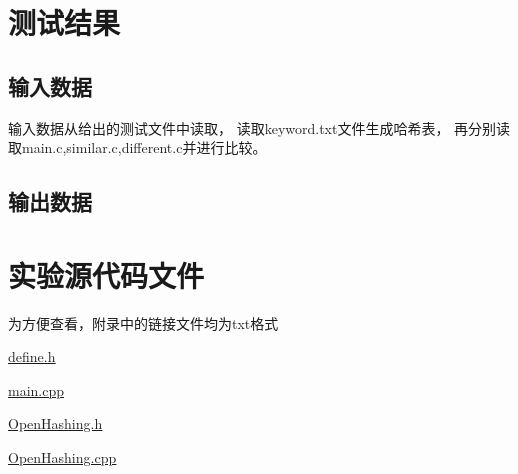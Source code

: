 \documentclass[a4paper]{article}
\begin{document}
    \section{测试结果}\label{sec:result}

    \subsection{输入数据}\label{subsec:in}
    {{输入数据从给出的测试文件中读取，
    读取keyword.txt文件生成哈希表，
    再分别读取main.c,similar.c,different.c并进行比较。}}

    \subsection{输出数据}\label{subsec:out}







    \noindent{ }



    \noindent{ }




    \appendix


    \section{实验源代码文件}\label{sec:appendix1}
    {{为方便查看，附录中的链接文件均为txt格式}}

    \href{../exp6/define.h.txt}{\underline{define.h}}

    \href{../exp6/main.cpp.txt}{\underline{main.cpp}}

    \href{../exp6/OpenHashing.h.txt}{\underline{OpenHashing.h}}

    \href{../exp6/OpenHashing.cpp.txt}{\underline{OpenHashing.cpp}}
\end{document}
